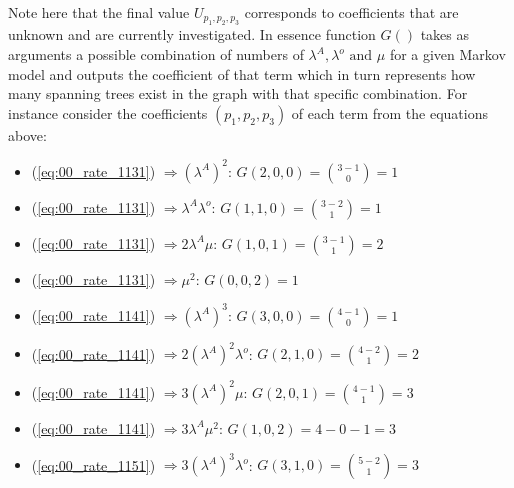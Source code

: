 Note here that the final value \(U_{p_1,p_2,p_3}\) corresponds to coefficients that are unknown and are currently investigated. In essence function \(G()\) takes as arguments a possible combination of numbers of \(\lambda^A, \lambda^o \text{ and } \mu \) for a given Markov model and outputs the coefficient of that term which in turn represents how many spanning trees exist in the graph with that specific combination. For instance consider the coefficients \((p_1,p_2,p_3)\) of each term from the equations above:

\begin{multicols}{2}
    \begin{itemize}
        \item (\ref{eq:00_rate_1131}) \( \Rightarrow (\lambda^A)^2\): \(G(2,0,0) = \binom{3-1}{0} = 1\)
        \item (\ref{eq:00_rate_1131}) \( \Rightarrow \lambda^A \lambda^o\): \(G(1,1,0) = \binom{3-2}{1} = 1\)
        \item (\ref{eq:00_rate_1131}) \( \Rightarrow 2 \lambda^A \mu\): \(G(1,0,1) = \binom{3-1}{1} = 2\)
        \item (\ref{eq:00_rate_1131}) \( \Rightarrow \mu^2\): \(G(0,0,2) = 1\)
        \item (\ref{eq:00_rate_1141}) \( \Rightarrow (\lambda^A)^3\): \(G(3,0,0) = \binom{4-1}{0} = 1\)
        \item (\ref{eq:00_rate_1141}) \( \Rightarrow 2(\lambda^A)^2 \lambda^o\): \(G(2,1,0) = \binom{4-2}{1} = 2\)
        \item (\ref{eq:00_rate_1141}) \( \Rightarrow 3(\lambda^A)^2 \mu\): \(G(2,0,1) = \binom{4-1}{1} = 3\)
        \item (\ref{eq:00_rate_1141}) \( \Rightarrow 3 \lambda^A \mu^2\): \(G(1,0,2) = 4 - 0 - 1 = 3\)
        \item (\ref{eq:00_rate_1151}) \( \Rightarrow 3 (\lambda^A)^3 \lambda^o\): \(G(3,1,0) = \binom{5-2}{1} = 3\)

\end{itemize}
\end{multicols}
